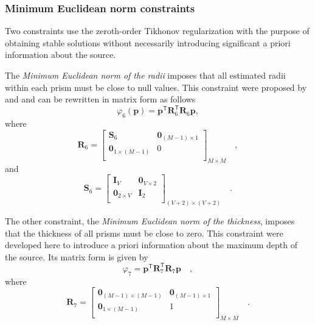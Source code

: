 \subsubsection{Minimum Euclidean norm constraints}

Two constraints use the zeroth-order Tikhonov regularization with the purpose of 
obtaining stable solutions without necessarily introducing significant a priori information 
about the source. 

The \textit{Minimum Euclidean norm of the radii} imposes that 
all estimated radii within each prism must be close to null values. This constraint were proposed by 
\citet{oliveirajr-etal2011} and \citet{oliveirajr-barbosa2013} and can be rewritten in matrix form 
as follows
\begin{equation}
\varphi_{6}(\mathbf{p}) = \mathbf{p}^{\mathsf{T}} \mathbf{R}_{6}^{\mathsf{T}} \mathbf{R}_{6} \mathbf{p},
\end{equation}
where
\begin{equation}
\mathbf{R}_{6} = 
\begin{bmatrix}
\mathbf{S}_{6} & \mathbf{0}_{(M-1) \times 1} \\
\mathbf{0}_{1 \times (M-1)} & 0 \\
\end{bmatrix}_{M\times M} \quad ,
\label{eq:R6-matrix}
\end{equation}
and 
\begin{equation}
\mathbf{S}_{6} = 
\begin{bmatrix}
\mathbf{I}_{V} & \mathbf{0}_{V \times 2} \\
\mathbf{0}_{2 \times V} & \mathbf{I}_{2} \\
\end{bmatrix}_{ (V+2)\times (V+2)} \quad .
\label{eq:S6-matrix}
\end{equation}

The other constraint, the \textit{Minimum Euclidean norm of the thickness}, imposes 
that the thickness of all prisms must be close to zero. This constraint were developed here 
to introduce a priori information about the maximum depth of the source. Its matrix form 
is given by
\begin{equation}
\varphi_7 = \mathbf{p}^{\mathsf{T}} \mathbf{R}_{7}^{\mathsf{T}} \mathbf{R}_{7} \mathbf{p} \quad ,
\label{eq:phi7}
\end{equation}
where
\begin{equation}
\mathbf{R}_{7} =
\begin{bmatrix}
\mathbf{0}_{(M-1) \times (M-1)} & \mathbf{0}_{(M-1) \times 1} \\
\mathbf{0}_{1 \times (M-1)} & 1 \\
\end{bmatrix}_{ M \times M } \quad .
\end{equation}